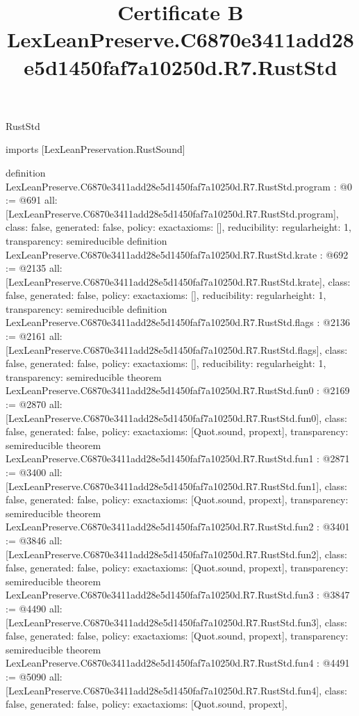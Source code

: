 \begin{lexlean}{RustStd}
\title{Certificate B LexLeanPreserve.C6870e3411add28e5d1450faf7a10250d.R7.RustStd}
\begin{coremodule}
imports [LexLeanPreservation.RustSound]

definition LexLeanPreserve.C6870e3411add28e5d1450faf7a10250d.R7.RustStd.program : @0 := @691 {
  all: [LexLeanPreserve.C6870e3411add28e5d1450faf7a10250d.R7.RustStd.program],
  class: false,
  generated: false,
  policy: exact{axioms: []},
  reducibility: regular{height: 1},
  transparency: semireducible
}
definition LexLeanPreserve.C6870e3411add28e5d1450faf7a10250d.R7.RustStd.krate : @692 := @2135 {
  all: [LexLeanPreserve.C6870e3411add28e5d1450faf7a10250d.R7.RustStd.krate],
  class: false,
  generated: false,
  policy: exact{axioms: []},
  reducibility: regular{height: 1},
  transparency: semireducible
}
definition LexLeanPreserve.C6870e3411add28e5d1450faf7a10250d.R7.RustStd.flags : @2136 := @2161 {
  all: [LexLeanPreserve.C6870e3411add28e5d1450faf7a10250d.R7.RustStd.flags],
  class: false,
  generated: false,
  policy: exact{axioms: []},
  reducibility: regular{height: 1},
  transparency: semireducible
}
theorem LexLeanPreserve.C6870e3411add28e5d1450faf7a10250d.R7.RustStd.fun0 : @2169 := @2870 {
  all: [LexLeanPreserve.C6870e3411add28e5d1450faf7a10250d.R7.RustStd.fun0],
  class: false,
  generated: false,
  policy: exact{axioms: [Quot.sound, propext]},
  transparency: semireducible
}
theorem LexLeanPreserve.C6870e3411add28e5d1450faf7a10250d.R7.RustStd.fun1 : @2871 := @3400 {
  all: [LexLeanPreserve.C6870e3411add28e5d1450faf7a10250d.R7.RustStd.fun1],
  class: false,
  generated: false,
  policy: exact{axioms: [Quot.sound, propext]},
  transparency: semireducible
}
theorem LexLeanPreserve.C6870e3411add28e5d1450faf7a10250d.R7.RustStd.fun2 : @3401 := @3846 {
  all: [LexLeanPreserve.C6870e3411add28e5d1450faf7a10250d.R7.RustStd.fun2],
  class: false,
  generated: false,
  policy: exact{axioms: [Quot.sound, propext]},
  transparency: semireducible
}
theorem LexLeanPreserve.C6870e3411add28e5d1450faf7a10250d.R7.RustStd.fun3 : @3847 := @4490 {
  all: [LexLeanPreserve.C6870e3411add28e5d1450faf7a10250d.R7.RustStd.fun3],
  class: false,
  generated: false,
  policy: exact{axioms: [Quot.sound, propext]},
  transparency: semireducible
}
theorem LexLeanPreserve.C6870e3411add28e5d1450faf7a10250d.R7.RustStd.fun4 : @4491 := @5090 {
  all: [LexLeanPreserve.C6870e3411add28e5d1450faf7a10250d.R7.RustStd.fun4],
  class: false,
  generated: false,
  policy: exact{axioms: [Quot.sound, propext]},
}
\end{coremodule}
\end{lexlean}
